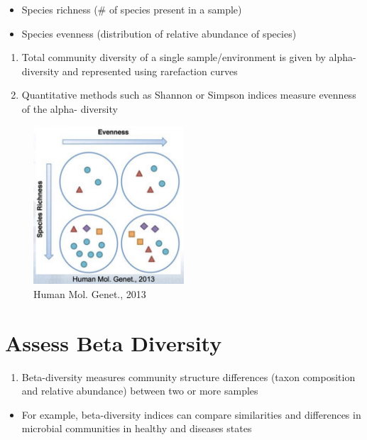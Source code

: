 \documentclass[
]{book}
\providecommand{\tightlist}{%
  \setlength{\itemsep}{0pt}\setlength{\parskip}{0pt}}
\begin{document}
\begin{itemize}
\tightlist
\item
  Species richness (\# of species present in a sample)
\item
  Species evenness (distribution of relative abundance of species)
\end{itemize}

\begin{enumerate}
\def\labelenumi{\arabic{enumi}.}
\setcounter{enumi}{1}
\item
  Total community diversity of a single sample/environment is given by alpha-diversity and represented using rarefaction curves
\item
  Quantitative methods such as Shannon or Simpson indices measure evenness of the alpha- diversity
\end{enumerate}

\begin{figure}
\centering
\includegraphics[width=0.5\textwidth,height=\textheight]{./Figures/Diversity.png}
\caption{Human Mol. Genet., 2013}
\end{figure}

\hypertarget{assess-beta-diversity}{%
\section{Assess Beta Diversity}\label{assess-beta-diversity}}

\begin{enumerate}
\def\labelenumi{\arabic{enumi}.}
\tightlist
\item
  Beta-diversity measures community structure differences (taxon composition and relative abundance) between two or more samples
\end{enumerate}

\begin{itemize}
\tightlist
\item
  For example, beta-diversity indices can compare similarities and differences in microbial communities in healthy and diseases states
\end{itemize}
\end{document}
